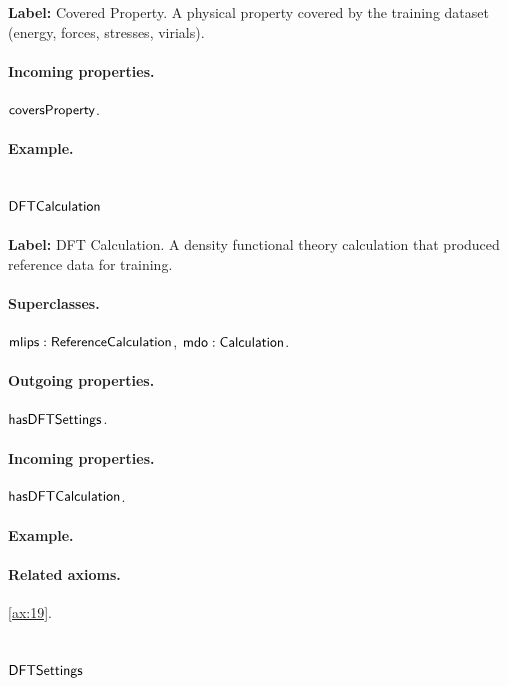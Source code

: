 \textbf{Label:} Covered Property.
A physical property covered by the training dataset (energy, forces, stresses, virials).

\paragraph{Incoming properties.} $\mathsf{coversProperty}$.

\paragraph{Example.}

\subsection{$\mathsf{DFTCalculation}$}
\label{sec:term-DFTCalculation}

\textbf{Label:} DFT Calculation.
A density functional theory calculation that produced reference data for training.

\paragraph{Superclasses.} $\mathsf{mlips:ReferenceCalculation}$, $\mathsf{mdo:Calculation}$.

\paragraph{Outgoing properties.} $\mathsf{hasDFTSettings}$.

\paragraph{Incoming properties.} $\mathsf{hasDFTCalculation}$.

\paragraph{Example.}

\paragraph{Related axioms.} \eqref{ax:19}.

\subsection{$\mathsf{DFTSettings}$}
\label{sec:term-DFTSettings}

